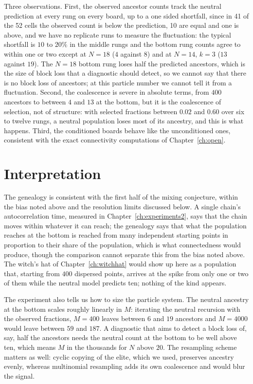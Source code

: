 Three observations. First, the observed ancestor counts track the neutral prediction at every rung on every board, up to a one sided shortfall, since in 41 of the 52 cells the observed count is below the prediction, 10 are equal and one is above, and we have no replicate runs to measure the fluctuation: the typical shortfall is $10$ to $20\%$ in the middle rungs and the bottom rung counts agree to within one or two except at $N = 18$ ($4$ against $8$) and at $N = 14$, $k = 3$ ($13$ against $19$). The $N = 18$ bottom rung loses half the predicted ancestors, which is the size of block loss that a diagnostic should detect, so we cannot say that there is no block loss of ancestors; at this particle number we cannot tell it from a fluctuation. Second, the coalescence is severe in absolute terms, from $400$ ancestors to between $4$ and $13$ at the bottom, but it is the coalescence of selection, not of structure: with selected fractions between $0.02$ and $0.60$ over six to twelve rungs, a neutral population loses most of its ancestry, and this is what happens. Third, the conditioned boards behave like the unconditioned ones, consistent with the exact connectivity computations of Chapter~\ref{ch:open}.

\section{Interpretation}

The genealogy is consistent with the first half of the mixing conjecture, within the bias noted above and the resolution limits discussed below. A single chain's autocorrelation time, measured in Chapter~\ref{ch:experiments2}, says that the chain moves within whatever it can reach; the genealogy says that what the population reaches at the bottom is reached from many independent starting points in proportion to their share of the population, which is what connectedness would produce, though the comparison cannot separate this from the bias noted above. The witch's hat of Chapter~\ref{ch:witchhat} would show up here as a population that, starting from $400$ dispersed points, arrives at the spike from only one or two of them while the neutral model predicts ten; nothing of the kind appears.

The experiment also tells us how to size the particle system. The neutral ancestry at the bottom scales roughly linearly in $M$: iterating the neutral recursion with the observed fractions, $M = 400$ leaves between $6$ and $19$ ancestors and $M = 4000$ would leave between $59$ and $187$. A diagnostic that aims to detect a block loss of, say, half the ancestors needs the neutral count at the bottom to be well above ten, which means $M$ in the thousands for $N$ above $20$. The resampling scheme matters as well: cyclic copying of the elite, which we used, preserves ancestry evenly, whereas multinomial resampling adds its own coalescence and would blur the signal.


